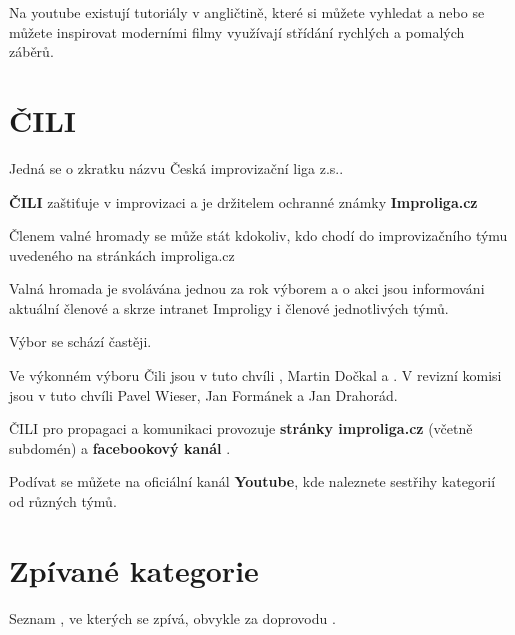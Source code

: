 Na youtube existují tutoriály v angličtině, které si můžete vyhledat a nebo se můžete inspirovat moderními filmy využívají střídání rychlých a pomalých záběrů. 
 
\needspace{5cm} \section{ČILI} \label{čili} Jedná se o zkratku názvu Česká improvizační liga z.s..   
 
\textbf{ČILI}{} zaštiťuje  v improvizaci a je držitelem ochranné známky  \textbf{Improliga.cz}{} 
 
Členem valné hromady se může stát kdokoliv, kdo chodí do improvizačního týmu uvedeného na stránkách improliga.cz 
 
Valná hromada je svolávána jednou za rok výborem a o akci jsou informováni aktuální členové a skrze intranet Improligy i členové jednotlivých týmů. 
 
Výbor se schází častěji. 
 
Ve výkonném výboru  Čili jsou v tuto chvíli  , Martin Dočkal a . 
V revizní komisi jsou v tuto chvíli  Pavel Wieser, Jan Formánek a Jan Drahorád. 
 
ČILI pro propagaci a komunikaci provozuje \textbf{stránky improliga.cz} (včetně subdomén) a \textbf{facebookový kanál} . 
 
Podívat se můžete na oficiální kanál \textbf{Youtube}, kde naleznete sestřihy kategorií od různých týmů. 
\needspace{5cm} \section{Zpívané kategorie} \label{zpívané kategorie} \label{:kategorie:zpívané kategorie}Seznam , ve kterých se zpívá, obvykle za doprovodu . 
 
